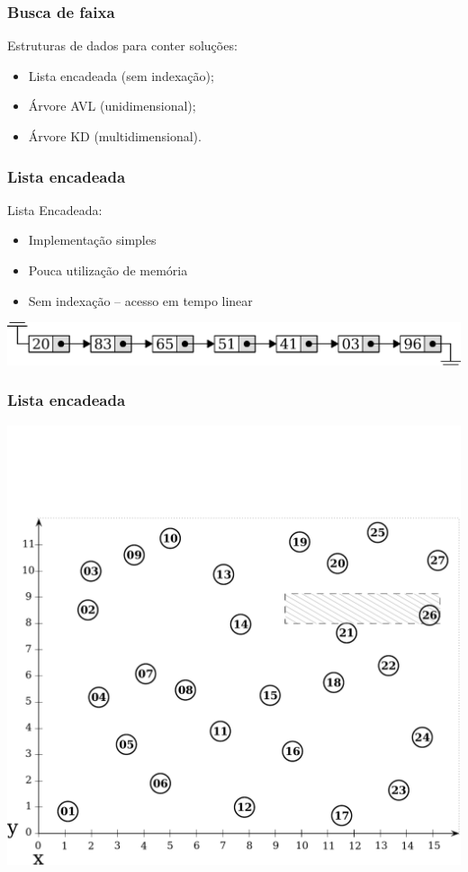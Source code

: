 \documentclass[10pt,xcolor=table,fleqn]{beamer}
\newcommand{\badpt}{{\color{defred} \DOWNarrow }}
\newcommand{\goodpt}{{\color{defgreen} \UParrow }}
\begin{document}
\begin{frame}
  \frametitle{Busca de faixa}
  Estruturas de dados para conter soluções:
  \begin{itemize}
    \item{ Lista encadeada (sem indexação)};
    \item{ Árvore AVL (unidimensional)};
    \item{ Árvore KD (multidimensional)}.
  \end{itemize}
\end{frame}

\begin{frame}
  \frametitle{Lista encadeada}
  Lista Encadeada:\\
  \begin{itemize}
    \item{ Implementação simples \goodpt }
    \item{ Pouca utilização de memória \goodpt }
    \item{ Sem indexação -- acesso em tempo linear \badpt }
  \end{itemize}
  \begin{center}
    \includegraphics[scale=0.4]{../img/kdt/lst-model}
  \end{center}
\end{frame}

\begin{frame}
  \frametitle{Lista encadeada}
  \begin{center}
    \includegraphics[scale=0.3]{../img/points-query/lst/points}
  \end{center}
\end{frame}
\end{document}
